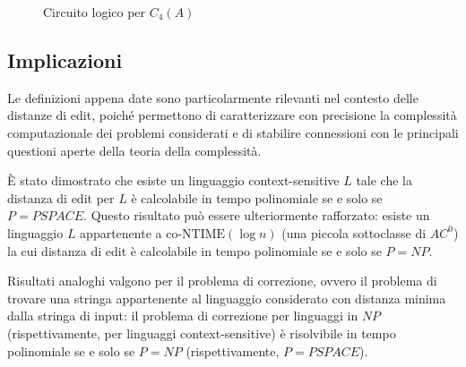 \documentclass[a4paper,12pt]{report}
\theoremstyle{propositionstyle}
\begin{document}
\begin{figure}[H]
        \caption{Circuito logico per $C_4(A)$}
        \label{fig:circuito_c4_orizzontale}
    \end{figure}

    \clearpage

    \subsection{Implicazioni}
    Le definizioni appena date sono particolarmente rilevanti nel contesto delle distanze di edit, poiché permettono di caratterizzare con precisione la complessità computazionale dei problemi considerati e di stabilire connessioni con le principali questioni aperte della teoria della complessità.

    È stato dimostrato che esiste un linguaggio context-sensitive $L$ tale che la distanza di edit per $L$ è calcolabile in tempo polinomiale se e solo se $P = PSPACE$.
    Questo risultato può essere ulteriormente rafforzato: esiste un linguaggio $L$ appartenente a $\text{co-NTIME}(\log n)$ (una piccola sottoclasse di $AC^0$) la cui distanza di edit è calcolabile in tempo polinomiale se e solo se $P = NP$.

    Risultati analoghi valgono per il problema di correzione, ovvero il problema di trovare una stringa appartenente al linguaggio considerato con distanza minima dalla stringa di input: il problema di correzione per linguaggi in $NP$ (rispettivamente, per linguaggi context-sensitive) è risolvibile in tempo polinomiale se e solo se $P = NP$ (rispettivamente, $P = PSPACE$).
\end{document}
